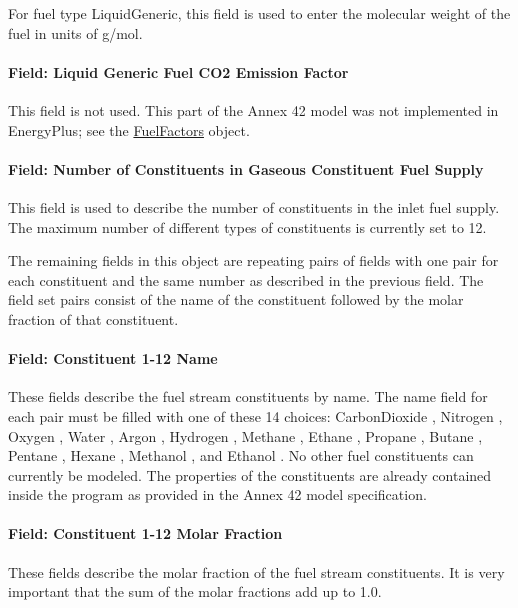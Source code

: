 For fuel type LiquidGeneric, this field is used to enter the molecular weight of the fuel in units of g/mol.

\paragraph{Field: Liquid Generic Fuel CO2 Emission Factor}\label{field-liquid-generic-fuel-co2-emission-factor}

This field is not used. This part of the Annex 42 model was not implemented in EnergyPlus; see the \hyperref[fuelfactors]{FuelFactors} object.

\paragraph{Field: Number of Constituents in Gaseous Constituent Fuel Supply}\label{field-number-of-constituents-in-gaseous-constituent-fuel-supply}

This field is used to describe the number of constituents in the inlet fuel supply. The maximum number of different types of constituents is currently set to 12.

The remaining fields in this object are repeating pairs of fields with one pair for each constituent and the same number as described in the previous field. The field set pairs consist of the name of the constituent followed by the molar fraction of that constituent.

\paragraph{Field: Constituent 1-12 Name}\label{field-constituent-1-12-name}

These fields describe the fuel stream constituents by name. The name field for each pair must be filled with one of these 14 choices: CarbonDioxide , Nitrogen , Oxygen , Water , Argon , Hydrogen , Methane , Ethane , Propane , Butane , Pentane , Hexane , Methanol , and Ethanol . No other fuel constituents can currently be modeled. The properties of the constituents are already contained inside the program as provided in the Annex 42 model specification.

\paragraph{Field: Constituent 1-12 Molar Fraction}\label{field-constituent-1-12-molar-fraction}

These fields describe the molar fraction of the fuel stream constituents. It is very important that the sum of the molar fractions add up to 1.0.

